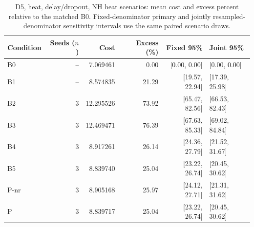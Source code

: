 \begin{table}[ht]
\centering\small
\caption{D5, heat, delay/dropout, NH heat scenarios: mean cost and excess percent relative to the matched B0. Fixed-denominator primary and jointly resampled-denominator sensitivity intervals use the same paired scenario draws.}\label{tab:revision_cost_E5_heat_locked_delay_dropout}
\begin{tabular}{@{}lrrrrl@{}}\toprule
Condition & Seeds ($n$) & Cost & Excess (\%) & Fixed 95\% & Joint 95\%\\\midrule
B0 & -- & 7.069461 & 0.00 & [0.00, 0.00] & [0.00, 0.00]\\
B1 & -- & 8.574835 & 21.29 & [19.57, 22.94] & [17.39, 25.98]\\
B2 & 3 & 12.295526 & 73.92 & [65.47, 82.56] & [66.53, 82.43]\\
B3 & 3 & 12.469471 & 76.39 & [67.63, 85.33] & [69.02, 84.84]\\
B4 & 3 & 8.917261 & 26.14 & [24.36, 27.79] & [21.52, 31.67]\\
B5 & 3 & 8.839740 & 25.04 & [23.22, 26.74] & [20.45, 30.62]\\
P-nr & 3 & 8.905168 & 25.97 & [24.12, 27.71] & [21.31, 31.62]\\
P & 3 & 8.839717 & 25.04 & [23.22, 26.74] & [20.45, 30.62]\\
\bottomrule\end{tabular}
\end{table}
